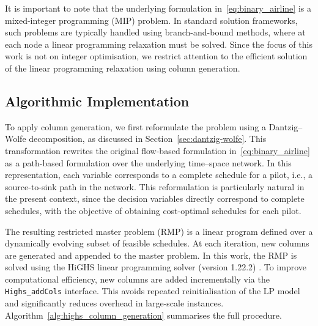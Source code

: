 \documentclass{book}
\theoremstyle{definition}
\newcounter{algorithm_}
\numberwithin{algorithm_}{chapter}
\begin{document}
{\bigskip

It is important to note that the underlying formulation in~\eqref{eq:binary_airline} is a mixed-integer programming (MIP) problem. In standard solution frameworks, such problems are typically handled using branch-and-bound methods, where at each node a linear programming relaxation must be solved. Since the focus of this work is not on integer optimisation, we restrict attention to the efficient solution of the linear programming relaxation using column generation.

\subsection{Algorithmic Implementation}

To apply column generation, we first reformulate the problem using a Dantzig--Wolfe decomposition, as discussed in Section~\ref{sec:dantzig-wolfe}. This transformation rewrites the original flow-based formulation in~\eqref{eq:binary_airline} as a path-based formulation over the underlying time--space network. In this representation, each variable corresponds to a complete schedule for a pilot, i.e., a source-to-sink path in the network. This reformulation is particularly natural in the present context, since the decision variables directly correspond to complete schedules, with the objective of obtaining cost-optimal schedules for each pilot.

\bigskip

The resulting restricted master problem (RMP) is a linear program defined over a dynamically evolving subset of feasible schedules. At each iteration, new columns are generated and appended to the master problem. In this work, the RMP is solved using the HiGHS linear programming solver (version 1.22.2) \cite{huangfu2018parallelizing}. To improve computational efficiency, new columns are added incrementally via the \texttt{Highs\_addCols} interface. This avoids repeated reinitialisation of the LP model and significantly reduces overhead in large-scale instances. Algorithm~\ref{alg:highs_column_generation} summarises the full procedure.

\bigskip

\begin{tcolorbox}[colback=gray!10!white, colframe=gray!80!black,
                  title=Algorithm 5.1: Column Generation with Persistent HiGHS LP Updates, sharp corners, boxrule=0.8pt]
{\small
\begin{algorithmic}[1]


\end{algorithmic}}
\end{tcolorbox}}
\end{document}
